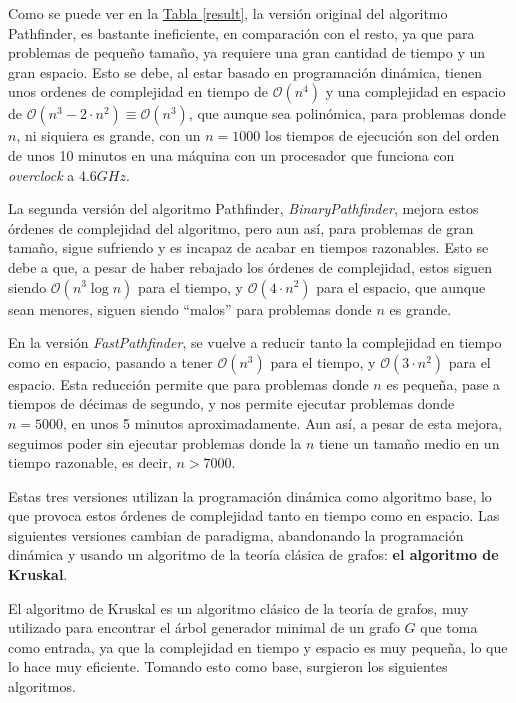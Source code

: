 \documentclass[paper=a4, fontsize=11pt]{article} %
\numberwithin{equation}{section} %
\numberwithin{figure}{section} %
\numberwithin{table}{section} %
\begin{document}


Como se puede ver en la \hyperref[result]{Tabla \ref*{result}}, la versión original del algoritmo Pathfinder, es bastante ineficiente, en comparación con el resto, ya que para problemas de pequeño tamaño, ya requiere una gran cantidad de tiempo y un gran espacio. Esto se debe, al estar basado en programación dinámica, tienen unos ordenes de complejidad en tiempo de $\mathcal{O}(n^4)$ y una complejidad en espacio de $\mathcal{O}(n^3-2\cdot n^2)\equiv\mathcal{O}(n^3)$, que aunque sea polinómica, para problemas donde $n$, ni siquiera es grande, con un $n=1000$ los tiempos de ejecución son del orden de unos 10 minutos en una máquina con un procesador que funciona con \textit{overclock} a $4.6GHz$.

La segunda versión del algoritmo Pathfinder, \textit{BinaryPathfinder}, mejora estos órdenes de complejidad del algoritmo, pero aun así, para problemas de gran tamaño, sigue sufriendo y es incapaz de acabar en tiempos razonables. Esto se debe a que, a pesar de haber rebajado los órdenes de complejidad, estos siguen siendo $\mathcal{O}(n^3\log n)$ para el tiempo, y $\mathcal{O}(4\cdot n^2)$ para el espacio, que aunque sean menores, siguen siendo ``malos'' para problemas donde $n$ es grande.

En la versión \textit{FastPathfinder}, se vuelve a reducir tanto la complejidad en tiempo como en espacio, pasando a tener $\mathcal{O}(n^3)$ para el tiempo, y $\mathcal{O}(3\cdot n^2)$ para el espacio. Esta reducción permite que para problemas donde $n$ es pequeña, pase a tiempos de décimas de segundo, y nos permite ejecutar problemas donde $n = 5000$, en unos 5 minutos aproximadamente. Aun así, a pesar de esta mejora, seguimos poder sin ejecutar problemas donde la $n$ tiene un tamaño medio en un tiempo razonable, es decir, $n > 7000$.

Estas tres versiones utilizan la programación dinámica como algoritmo base, lo que provoca estos órdenes de complejidad tanto en tiempo como en espacio. Las siguientes versiones cambian de paradigma, abandonando la programación dinámica y usando un algoritmo de la teoría clásica de grafos: \textbf{el algoritmo de Kruskal}.

El algoritmo de Kruskal es un algoritmo clásico de la teoría de grafos, muy utilizado para encontrar el árbol generador minimal de un grafo $G$ que toma como entrada, ya que la complejidad en tiempo y espacio es muy pequeña, lo que lo hace muy eficiente. Tomando esto como base, surgieron los siguientes algoritmos.
\end{document}
